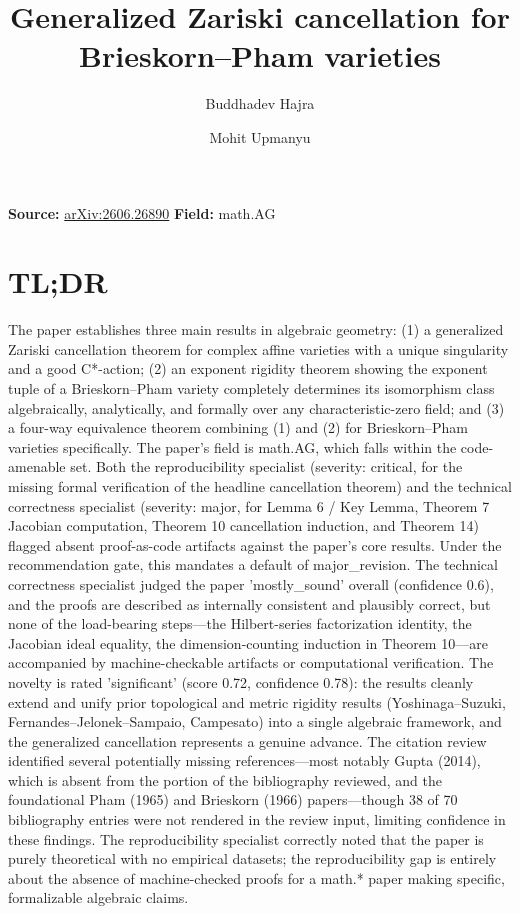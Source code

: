 \documentclass[11pt]{article}
\title{Generalized Zariski cancellation for Brieskorn--Pham varieties}
\author{Buddhadev Hajra \and Mohit Upmanyu}
\date{}
\begin{document}
\maketitle

\noindent\textbf{Source:} \href{https://arxiv.org/abs/2606.26890}{arXiv:2606.26890} \quad \textbf{Field:} math.AG\\

\section*{TL;DR}
The paper establishes three main results in algebraic geometry: (1) a generalized Zariski cancellation theorem for complex affine varieties with a unique singularity and a good C*-action; (2) an exponent rigidity theorem showing the exponent tuple of a Brieskorn--Pham variety completely determines its isomorphism class algebraically, analytically, and formally over any characteristic-zero field; and (3) a four-way equivalence theorem combining (1) and (2) for Brieskorn--Pham varieties specifically. The paper's field is math.AG, which falls within the code-amenable set. Both the reproducibility specialist (severity: critical, for the missing formal verification of the headline cancellation theorem) and the technical correctness specialist (severity: major, for Lemma 6 / Key Lemma, Theorem 7 Jacobian computation, Theorem 10 cancellation induction, and Theorem 14) flagged absent proof-as-code artifacts against the paper's core results. Under the recommendation gate, this mandates a default of major\_revision. The technical correctness specialist judged the paper 'mostly\_sound' overall (confidence 0.6), and the proofs are described as internally consistent and plausibly correct, but none of the load-bearing steps---the Hilbert-series factorization identity, the Jacobian ideal equality, the dimension-counting induction in Theorem 10---are accompanied by machine-checkable artifacts or computational verification. The novelty is rated 'significant' (score 0.72, confidence 0.78): the results cleanly extend and unify prior topological and metric rigidity results (Yoshinaga--Suzuki, Fernandes--Jelonek--Sampaio, Campesato) into a single algebraic framework, and the generalized cancellation represents a genuine advance. The citation review identified several potentially missing references---most notably Gupta (2014), which is absent from the portion of the bibliography reviewed, and the foundational Pham (1965) and Brieskorn (1966) papers---though 38 of 70 bibliography entries were not rendered in the review input, limiting confidence in these findings. The reproducibility specialist correctly noted that the paper is purely theoretical with no empirical datasets; the reproducibility gap is entirely about the absence of machine-checked proofs for a math.* paper making specific, formalizable algebraic claims.
\end{document}

